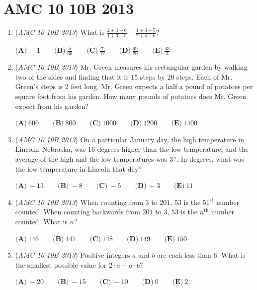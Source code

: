 \section{AMC 10 10B 2013}
        \begin{enumerate}
        	\item (\textit{AMC 10 10B 2013}) What is $\frac{2+4+6}{1+3+5} - \frac{1+3+5}{2+4+6}$?


 $\textbf{(A)}\ -1 \qquad\textbf{(B)}\ \frac{5}{36}  \qquad\textbf{(C)}\ \frac{7}{12} \qquad\textbf{(D)}\ \frac{49}{20} \qquad\textbf{(E)}\ \frac{43}{3}$


	\item (\textit{AMC 10 10B 2013}) Mr. Green  measures his rectangular garden by walking two of the sides and finding that it is $15$ steps by $20$ steps.  Each of Mr. Green's steps is $2$ feet long.  Mr. Green expects a half a pound of potatoes per square foot from his garden.  How many pounds of potatoes does Mr. Green expect from his garden?


 $\textbf{(A)}\ 600 \qquad\textbf{(B)}\ 800  \qquad\textbf{(C)}\ 1000 \qquad\textbf{(D)}\ 1200 \qquad\textbf{(E)}\ 1400$


	\item (\textit{AMC 10 10B 2013}) On a particular January day, the high temperature in Lincoln, Nebraska, was $16$ degrees higher than the low temperature, and the average of the high and the low temperatures was $3\,^\circ$. In degrees, what was the low temperature in Lincoln that day?


 $\textbf{(A)}\ -13\qquad\textbf{(B)}\ -8\qquad\textbf{(C)}\ -5\qquad\textbf{(D)}\ -3\qquad\textbf{(E)}\ 11$


	\item (\textit{AMC 10 10B 2013}) When counting from $3$ to $201$, $53$ is the $51^\mathrm{st}$ number counted. When counting backwards from $201$ to $3$, $53$ is the $n^\mathrm{th}$ number counted. What is $n$?


 $\textbf{(A)}\ 146\qquad\textbf{(B)}\ 147\qquad\textbf{(C)}\ 148\qquad\textbf{(D)}\ 149\qquad\textbf{(E)}\ 150$


	\item (\textit{AMC 10 10B 2013}) Positive integers $a$ and $b$ are each less than $6$. What is the smallest possible value for $2 \cdot a - a \cdot b$?


 

$\textbf{(A)}\ -20\qquad\textbf{{(B)}}\ -15\qquad\textbf{{(C)}}\ -10\qquad\textbf{{(D)}}\ 0\qquad\textbf{{(E)}}\ 2$



\end{enumerate}
